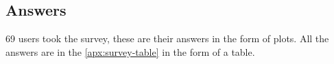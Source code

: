 \newcommand{\surveyPlot}[2]{
\begin{subfigure}[t]{0.5\textwidth-0.1cm}
    \centering
    
    \begin{tikzpicture}[scale=0.85]
        \begin{axis}[
            ybar, 
            ymin=0,
        ]
            \addplot +[
                hist={data min=1, data max=5},
                fill=ForestGreen!33,
                draw=black,
            ] table [y index=#1, col sep=comma, ignore chars="] {media/data/survey.csv};
        \end{axis}
    \end{tikzpicture}
    \caption*{#1. #2}\label{fig:question-plot-#1}
\end{subfigure}
}



\subsection{Answers}
69 users took the survey, these are their answers in the form of plots. All the answers are in the \cref{apx:survey-table} in the form of a table.

